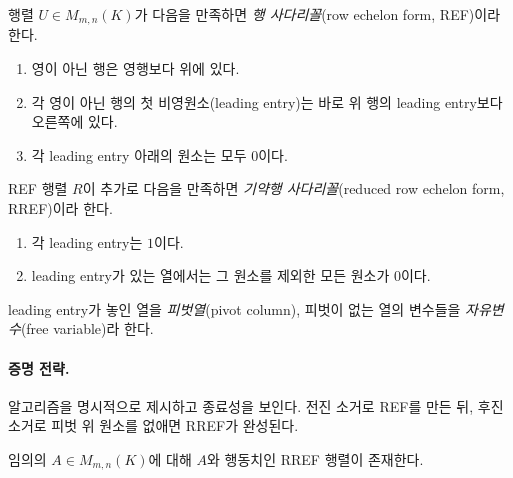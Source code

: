 
\begin{definition}
행렬 $U\in M_{m,n}(K)$가 다음을 만족하면 \emph{행 사다리꼴}(row echelon form, REF)이라 한다.
\begin{enumerate}[label=(\roman*)]
\item 영이 아닌 행은 영행보다 위에 있다.
\item 각 영이 아닌 행의 첫 비영원소(leading entry)는 바로 위 행의 leading entry보다 오른쪽에 있다.
\item 각 leading entry 아래의 원소는 모두 $0$이다.
\end{enumerate}
\end{definition}

\begin{definition}
REF 행렬 $R$이 추가로 다음을 만족하면 \emph{기약행 사다리꼴}(reduced row echelon form, RREF)이라 한다.
\begin{enumerate}[label=(\roman*)]
\item 각 leading entry는 $1$이다.
\item leading entry가 있는 열에서는 그 원소를 제외한 모든 원소가 $0$이다.
\end{enumerate}
leading entry가 놓인 열을 \emph{피벗열}(pivot column), 피벗이 없는 열의 변수들을 \emph{자유변수}(free variable)라 한다.
\end{definition}

\paragraph{증명 전략.}
알고리즘을 명시적으로 제시하고 종료성을 보인다. 전진 소거로 REF를 만든 뒤, 후진 소거로 피벗 위 원소를 없애면 RREF가 완성된다.

\begin{theorem}[RREF의 존재]
임의의 $A\in M_{m,n}(K)$에 대해 $A$와 행동치인 RREF 행렬이 존재한다.
\end{theorem}

